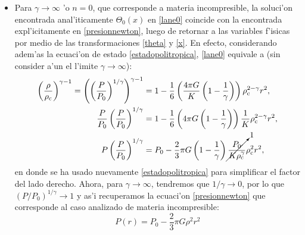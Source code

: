 \begin{itemize}

\item Para $\gamma\to\infty$ 'o $n=0$, que corresponde a materia incompresible, la soluci'on encontrada anal'iticamente $\Theta_0(x)$ en \eqref{lane0} coincide con la encontrada expl'icitamente en \eqref{presionnewton}, luego de retornar a las variables f'isicas por medio de las transformaciones \eqref{theta} y \eqref{x}. En efecto, considerando adem'as la ecuaci'on de estado \eqref{estadopolitropica}, \eqref{lane0} equivale a (sin consider a'un el l'imite $\gamma\to\infty$):
\begin{align}
 \left(\frac{\rho}{\rho_{\rm c}}\right)^{\gamma-1}=\left(\left(\frac{P}{P_0}\right)^{1/\gamma}\right)^{\gamma-1}&=1-\frac{1}{6}\left(\frac{4\pi G}{K}\left(1-\frac{1}{\gamma}\right)\right)\rho_{\rm c}^{2-\gamma}r^2,\\
\frac{P}{P_0}\left(\frac{P}{P_0}\right)^{1/\gamma}&=1-\frac{1}{6}\left(4\pi G\left(1-\frac{1}{\gamma}\right)\right)\frac{1}{K}\rho_{\rm c}^{2-\gamma}r^2,\\
P\left(\frac{P}{P_0}\right)^{1/\gamma}&=P_0-\frac{2}{3}\pi G\left(1-\frac{1}{\gamma}\right)\cancelto{1}{\frac{P_0}{K\rho_{\rm c}^{\gamma}}}\rho_{\rm c}^{2}r^2,
\end{align}
en donde se ha usado nuevamente \eqref{estadopolitropica} para simplificar el factor del lado derecho. Ahora,  para $\gamma\to\infty$, tendremos que $1/\gamma\to 0 $, por lo que $(P/P_0)^{1/\gamma}\to 1$ y as'i recuperamos la ecuaci'on \eqref{presionnewton} que corresponde al caso analizado de materia incompresible:
\begin{equation}
 P(r)=P_0-\frac{2}{3}\pi G\rho^2r^2
\end{equation}



\end{itemize}
